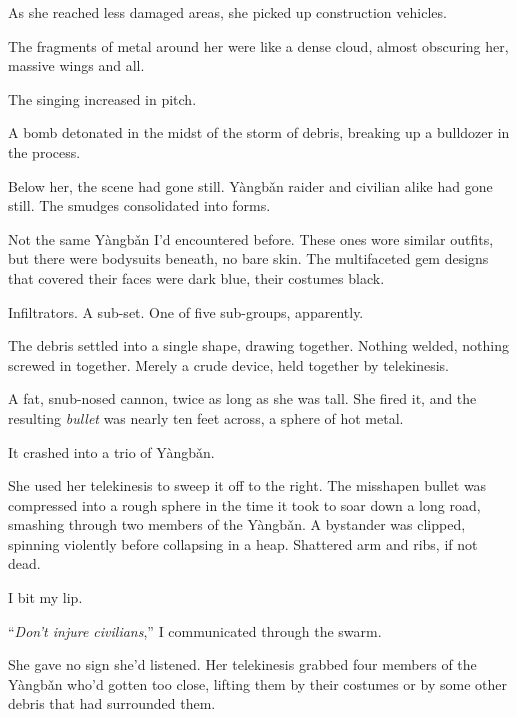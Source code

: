 As she reached less damaged areas, she picked up construction vehicles.



The fragments of metal around her were like a dense cloud, almost obscuring her, massive wings and all.



The singing increased in pitch.



A bomb detonated in the midst of the storm of debris, breaking up a bulldozer in the process.



Below her, the scene had gone still.  Y\`{a}ngb\v{a}n raider and civilian alike had gone still.  The smudges consolidated into forms.



Not the same Y\`{a}ngb\v{a}n I'd encountered before.  These ones wore similar outfits, but there were bodysuits beneath, no bare skin.  The multifaceted gem designs that covered their faces were dark blue, their costumes black.



Infiltrators.  A sub-set.  One of five sub-groups, apparently.



The debris settled into a single shape, drawing together.  Nothing welded, nothing screwed in together.  Merely a crude device, held together by telekinesis.



A fat, snub-nosed cannon, twice as long as she was tall.  She fired it, and the resulting \emph{bullet} was nearly ten feet across, a sphere of hot metal.



It crashed into a trio of Y\`{a}ngb\v{a}n.



She used her telekinesis to sweep it off to the right.  The misshapen bullet was compressed into a rough sphere in the time it took to soar down a long road, smashing through two members of the Y\`{a}ngb\v{a}n.  A bystander was clipped, spinning violently before collapsing in a heap.  Shattered arm and ribs, if not dead.



I bit my lip.



``\emph{Don't injure civilians},'' I communicated through the swarm.



She gave no sign she'd listened.  Her telekinesis grabbed four members of the Y\`{a}ngb\v{a}n who'd gotten too close, lifting them by their costumes or by some other debris that had surrounded them.



